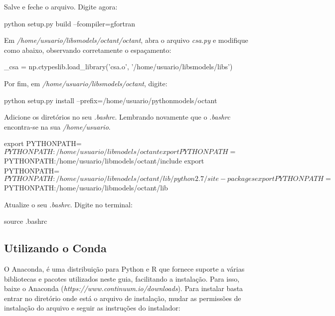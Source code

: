 \noindent Salve e feche o arquivo. Digite agora:
\bigskip

\begin{bashcode}
python setup.py build --fcompiler=gfortran
\end{bashcode}
\bigskip

\noindent Em \textit{/home/usuario/libsmodels/octant/octant}, abra o arquivo \textit{csa.py} e modifique como abaixo, observando corretamente o espaçamento:
\bigskip

\begin{bashcode}
_csa = np.ctypeslib.load_library('csa.o', '/home/usuario/libsmodels/libs')
\end{bashcode}
\bigskip

\noindent Por fim, em \textit{/home/usuario/libsmodels/octant}, digite:
\bigskip

\begin{bashcode}
python setup.py install --prefix=/home/usuario/pythonmodels/octant
\end{bashcode}
\bigskip

\noindent Adicione os diretórios no seu \textit{.bashrc}. Lembrando novamente que o \textit{.bashrc} encontra-se na sua \textit{/home/usuario}.
\bigskip

\begin{bashcode}[fontsize=\scriptsize]
export PYTHONPATH=$PYTHONPATH:/home/usuario/libmodels/octant
export PYTHONPATH=$PYTHONPATH:/home/usuario/libmodels/octant/include
export PYTHONPATH=$PYTHONPATH:/home/usuario/libmodels/octant/lib/python2.7/site-packages
export PYTHONPATH=$PYTHONPATH:/home/usuario/libmodels/octant/lib
\end{bashcode}
\bigskip

\noindent Atualize o seu \textit{.bashrc}. Digite no terminal:
\bigskip

\begin{bashcode}
source .bashrc
\end{bashcode}
\bigskip

\subsection{Utilizando o Conda}\label{condasec}
\bigskip
\noindent O Anaconda, é uma distribuição para Python e R que fornece suporte a várias bibliotecas e pacotes utilizados neste guia, facilitando a instalação. Para isso, baixe o Anaconda (\textcolor{bleu_cite}{\textit{https://www.continuum.io/downloads}}). Para instalar basta entrar no diretório onde está o arquivo de instalação, mudar as permissões de instalação do arquivo e seguir as instruções do instalador:
\bigskip

